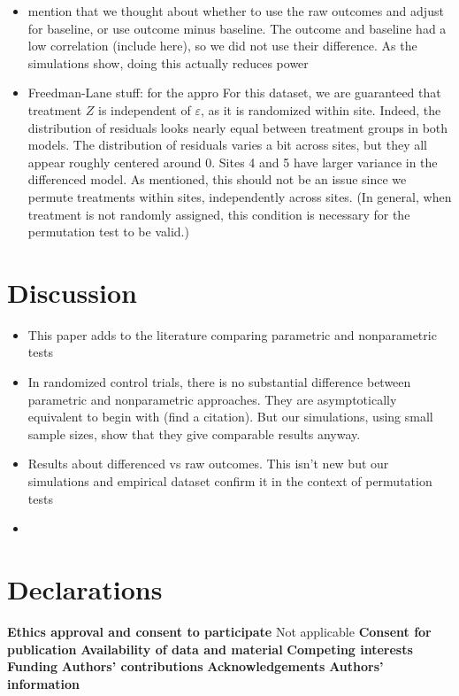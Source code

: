 \documentclass[11pt]{article}
\newcommand{\bit}{\begin{itemize}}
\newcommand{\eit}{\end{itemize}}
\begin{document}
\bit
\item mention that we thought about whether to use the raw outcomes and adjust for baseline, or use outcome minus baseline. The outcome and baseline had a low correlation (include here), so we did not use their difference. As the simulations show, doing this actually reduces power
\item Freedman-Lane stuff: for the appro
For this dataset, we are guaranteed that treatment $Z$ is independent of $\varepsilon$, as it is randomized within site.
Indeed, the distribution of residuals looks nearly equal between treatment groups in both models.
The distribution of residuals varies a bit across sites, but they all appear roughly centered around 0.
Sites 4 and 5 have larger variance in the differenced model.
As mentioned, this should not be an issue since we permute treatments within sites, independently across sites.
(In general, when treatment is not randomly assigned, this condition is necessary for the permutation test to be valid.)
\eit


\section{Discussion}

\bit
\item This paper adds to the literature comparing parametric and nonparametric tests
\item In randomized control trials, there is no substantial difference between parametric and nonparametric approaches.  They are asymptotically equivalent to begin with (find a citation). But our simulations, using small sample sizes, show that they give comparable results anyway.
\item Results about differenced vs raw outcomes. This isn't new but our simulations and empirical dataset confirm it in the context of permutation tests
\item 
\eit



\section{Declarations}
\textbf{Ethics approval and consent to participate}
Not applicable
\textbf{Consent for publication}
\textbf{Availability of data and material}
\textbf{Competing interests}
\textbf{Funding}
\textbf{Authors' contributions}
\textbf{Acknowledgements}
\textbf{Authors' information}



\end{document}
